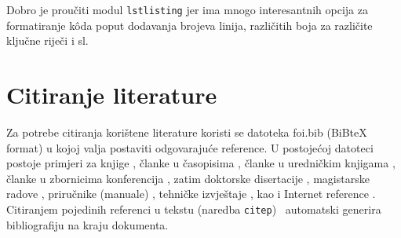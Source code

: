 \documentclass[a4paper,12pt]{foi}
\begin{document}
Dobro je proučiti modul \texttt{lstlisting} jer ima mnogo interesantnih opcija za formatiranje k\^{o}da poput dodavanja brojeva linija, različitih boja za različite ključne riječi i sl.

\chapter{Citiranje literature}

Za potrebe citiranja kori\v{s}tene literature koristi se datoteka foi.bib (BiBteX format) u kojoj valja postaviti odgovaraju\'{c}e reference. U postoje\'{c}oj datoteci postoje primjeri za knjige \citep{Baral2004, Jennex2007, JohsansenSwigart2000, PogacnikBloom1998}, \v{c}lanke u \v{c}asopisima \citep{BacaEtAl2007, Jurin2006}, \v{c}lanke u uredni\v{c}kim knjigama \citep{Garzarelli2004, Luhmann2003}, \v{c}lanke u zbornicima konferencija \citep{AbeleBischoff2001, BacaEtAl2006}, zatim doktorske disertacije \citep{Bahr2009}, magistarske radove \citep{Schatten2008}, priru\v{c}nike (manuale) \citep{HAZU2004}, tehni\v{c}ke izvje\v{s}taje \citep{BlonkEtAll1998}, kao i Internet reference \citep{Berger2006, Pilgrim2006}. Citiranjem pojedinih referenci u tekstu (naredba \texttt{citep}) \LaTeXe\ automatski generira bibliografiju na kraju dokumenta.


\end{document}
